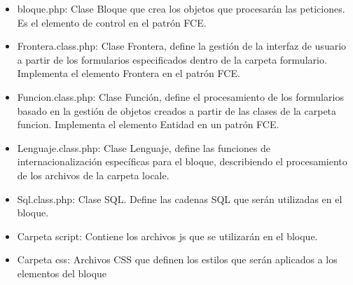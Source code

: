 \begin{itemize}
 \item bloque.php: Clase Bloque que crea los objetos que procesarán las peticiones. Es el elemento de control en el patrón FCE.
 \item Frontera.class.php: Clase Frontera, define la gestión de la interfaz de usuario a partir de los formularios especificados dentro de la carpeta formulario. Implementa el elemento Frontera en el patrón FCE.
 \item Funcion.class.php:  Clase Función, define el procesamiento de los formularios basado en la gestión de objetos creados a partir de las clases de la carpeta funcion. Implementa el elemento Entidad en un patrón FCE.
 \item Lenguaje.class.php: Clase Lenguaje, define las funciones de internacionalización específicas para el bloque, describiendo el procesamiento de los archivos de la carpeta locale.
 \item Sql.class.php: Clase SQL. Define las cadenas SQL que serán utilizadas en el bloque.
 \item Carpeta script: Contiene los archivos js que se utilizarán en el bloque.
 \item Carpeta css: Archivos CSS que definen los estilos que serán aplicados a los elementos del bloque
\end{itemize}